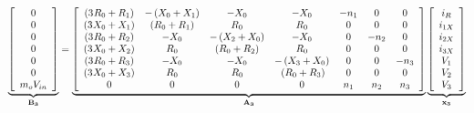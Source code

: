 \documentclass[english]{cobep-spec}
\begin{document}
\begin{figure}[!t]
	
	\begin{equation}\label{eq:sys3matrixSol}
	\underbrace {\left[ {\begin{array}{*{20}{c}}
			0\\
			0\\
			0\\
			0\\
			0\\
			0\\
			{{m_o}{V_{in}}}
			\end{array}} \right]}_{{{\bf{B}}_{\bf{3}}}} = \underbrace {\left[ {\begin{array}{*{20}{c}}
			{\left( {3{\mkern 1mu} {R_0} + {R_1}} \right)}&{ - \left( {{X_0} + {X_1}} \right)}&{ - {X_0}}&{ - {X_0}}&{ - {n_1}}&0&0\\
			{\left( {3{\mkern 1mu} {X_0} + {X_1}} \right)}&{\left( {{R_0} + {R_1}} \right)}&{{R_0}}&{{R_0}}&0&0&0\\
			{\left( {3{\mkern 1mu} {R_0} + {R_2}} \right)}&{ - {X_0}}&{ - \left( {{X_2} + {X_0}} \right)}&{ - {X_0}}&0&{ - {n_2}}&0\\
			{\left( {3{\mkern 1mu} {X_0} + {X_2}} \right)}&{{R_0}}&{\left( {{R_0} + {R_2}} \right)}&{{R_0}}&0&0&0\\
			{\left( {3{\mkern 1mu} {R_0} + {R_3}} \right)}&{ - {X_0}}&{ - {X_0}}&{ - \left( {{X_3} + {X_0}} \right)}&0&0&{ - {n_3}}\\
			{\left( {3{\mkern 1mu} {X_0} + {X_3}} \right)}&{{R_0}}&{{\mkern 1mu} {R_0}}&{{\mkern 1mu} \left( {{R_0} + {R_3}} \right)}&0&0&0\\
			0&0&0&0&{{n_1}}&{{n_2}}&{{n_3}}
			\end{array}} \right]}_{{{\bf{A}}_{\bf{3}}}}\underbrace {\left[ {\begin{array}{*{20}{c}}
			{{i_R}}\\
			{{i_{1X}}}\\
			{{i_{2X}}}\\
			{{i_{3X}}}\\
			{{V_1}}\\
			{{V_2}}\\
			{{V_3}}
			\end{array}} \right]}_{{{\bf{x}}_{\bf{3}}}}
	\end{equation}
	
	
	\hrulefill
\end{figure}
\end{document}
